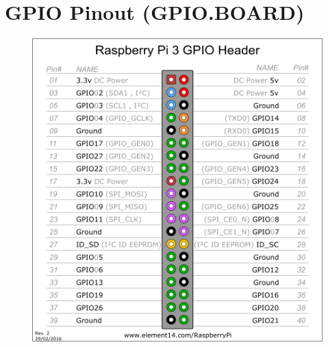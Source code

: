 \section{GPIO Pinout (GPIO.BOARD)}
	\label{sec:pinout}
	\begin{figure}[h]
		\centering
		\includegraphics[width=0.9\linewidth]{McrRaspJam/011_Motors/a1_GPIO/pinout.png}
		\label{fig:pinout}
	\end{figure}